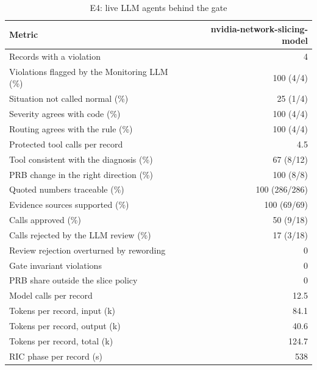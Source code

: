 \begin{table}[!t]
\centering
\caption{E4: live LLM agents behind the gate}\label{tab:live}
\footnotesize
\setlength{\tabcolsep}{3pt}
\begin{tabular}{@{}lr@{}}
\toprule
Metric & nvidia-network-slicing-model \\
\midrule
Records with a violation & 4 \\
Violations flagged by the Monitoring LLM (\%) & 100 (4/4) \\
Situation not called normal (\%) & 25 (1/4) \\
Severity agrees with code (\%) & 100 (4/4) \\
Routing agrees with the rule (\%) & 100 (4/4) \\
Protected tool calls per record & 4.5 \\
Tool consistent with the diagnosis (\%) & 67 (8/12) \\
PRB change in the right direction (\%) & 100 (8/8) \\
Quoted numbers traceable (\%) & 100 (286/286) \\
Evidence sources supported (\%) & 100 (69/69) \\
Calls approved (\%) & 50 (9/18) \\
Calls rejected by the LLM review (\%) & 17 (3/18) \\
Review rejection overturned by rewording & 0 \\
Gate invariant violations & 0 \\
PRB share outside the slice policy & 0 \\
Model calls per record & 12.5 \\
Tokens per record, input (k) & 84.1 \\
Tokens per record, output (k) & 40.6 \\
Tokens per record, total (k) & 124.7 \\
RIC phase per record (s) & 538 \\
\bottomrule
\end{tabular}
\end{table}
